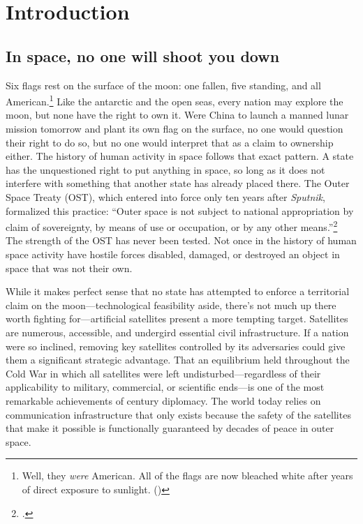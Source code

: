 \documentclass[11pt]{memoir}
\begin{document}

\section{Introduction}
\subsection{In space, no one will shoot you down}
Six flags rest on the surface of the moon: one fallen, five standing, and all American.\footnote{Well, they \emph{were} American. All of the flags are now bleached white after years of direct exposure to sunlight. (\cite{spudis_faded_2011})} Like the antarctic and the open seas, every nation may explore the moon, but none have the right to own it. Were China to launch a manned lunar mission tomorrow and plant its own flag on the surface, no one would question their right to do so, but no one would interpret that as a claim to ownership either. The history of human activity in space follows that exact pattern. A state has the unquestioned right to put anything in space, so long as it does not interfere with something that another state has already placed there. The Outer Space Treaty (OST), which entered into force only ten years after \emph{Sputnik}, formalized this practice: ``Outer space \textelp{} is not subject to national appropriation by claim of sovereignty, by means of use or occupation, or by any other means.''\footcite{noauthor_outer_1966} The strength of the OST has never been tested. Not once in the history of human space activity have hostile forces disabled, damaged, or destroyed an object in space that was not their own.

While it makes perfect sense that no state has attempted to enforce a territorial claim on the moon---technological feasibility aside, there's not much up there worth fighting for---artificial satellites present a more tempting target. Satellites are numerous, accessible, and undergird essential civil infrastructure. If a nation were so inclined, removing key satellites controlled by its adversaries could give them a significant strategic advantage. That an equilibrium held throughout the Cold War in which all satellites were left undisturbed---regardless of their applicability to military, commercial, or scientific ends---is one of the most remarkable achievements of  century diplomacy. The world today relies on communication infrastructure that only exists because the safety of the satellites that make it possible is functionally guaranteed by decades of peace in outer space.
\end{document}
